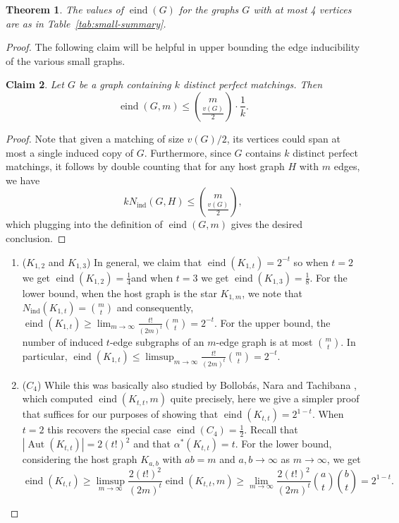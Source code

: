 \documentclass[reqno,11pt]{amsart}
\numberwithin{equation}{section}
\newtheorem{theorem}{Theorem}[section]
\newtheorem{claim}[theorem]{Claim}
\theoremstyle{definition}
\theoremstyle{remark}
\newcommand{\abs}[1]{\left\lvert#1\right\rvert}
\DeclareMathOperator{\ind}{ind}
\DeclareMathOperator{\eind}{eind}
\DeclareMathOperator{\Aut}{Aut}
\begin{document}
\begin{theorem}
    The values of $\eind(G)$ for the graphs $G$ with at most 4 vertices are as in Table~\ref{tab:small-summary}. 
\end{theorem}

\begin{proof} 
The following claim will be helpful in upper bounding the edge inducibility of the various small graphs. 
\begin{claim}\label{claim:upper-bound}
    Let $G$ be a graph containing $k$ distinct perfect matchings. Then \[\eind(G,m) \leq \binom{m}{\frac{v(G)}{2}} \cdot \frac{1}{k}.\]
\end{claim}
\begin{proof}
    Note that given a matching of size $v(G)/2$, its vertices could span at most a single induced copy of $G$. Furthermore, since $G$ contains $k$ distinct perfect matchings, it follows by double counting that for any host graph $H$ with $m$ edges, we have 
    \[ k N_{\ind}(G,H) \leq \binom{m}{\frac{v(G)}{2}},\]
    which plugging into the definition of $\eind(G,m)$ gives the desired conclusion.
\end{proof}
    \begin{enumerate}[leftmargin=*,topsep=0pt]
        \item [(1)] ($K_{1,2}$ and $K_{1,3}$) In general, we claim that $\eind(K_{1,t}) = 2^{-t}$ so when $t= 2$ we get $\eind(K_{1,2}) = \frac{1}{4}$\linebreak and when $t = 3$ we get $\eind(K_{1,3}) = \frac{1}{8}$. For the lower bound, when the host graph is the star $K_{1,m}$, we note that $N_{\ind}(K_{1,t}) = \binom{m}{t}$ and consequently, $\eind(K_{1,t}) \geq \lim_{m \to \infty}\frac{t!}{(2 m)^{t}}\binom{m}{t} = 2^{-t}$. For the upper bound, the number of induced $t$-edge subgraphs of an $m$-edge graph is at most $\binom{m}{t}$. In particular, $\eind(K_{1,t}) \leq \limsup_{m\to \infty} \frac{t!}{(2m)^{t}} \binom{m}{t}=2^{-t}$.
        
        \item [(2)] ($C_4$) While this was basically also studied by Bollob\'as, Nara and Tachibana \cite{BolNarTac1986}, which computed $\eind(K_{t,t},m)$ quite precisely, here we give a simpler proof that suffices for our purposes of showing that $\eind(K_{t,t}) = 2^{1-t}$. When $t = 2$ this recovers the special case $\eind(C_4) = \frac{1}{2}$. Recall that $\abs{\Aut(K_{t,t})}=2(t!)^2$ and that $\alpha^*(K_{t,t})=t$. For the lower bound, considering the host graph $K_{a,b}$ with $ab = m$ and $a,b \to \infty$ as $m\to\infty$, we get 
        \[
            \eind (K_{t,t})\geq \limsup_{m\to \infty}\frac{2(t!)^2}{(2m)^t} \eind(K_{t,t},m) \ge 
            \lim_{m\to \infty}\frac{2(t!)^2}{(2m)^t}\binom{a}{t}\binom{b}{t} = 2^{1-t}. 
        \]
    

\end{enumerate}
\end{proof}
\end{document}
